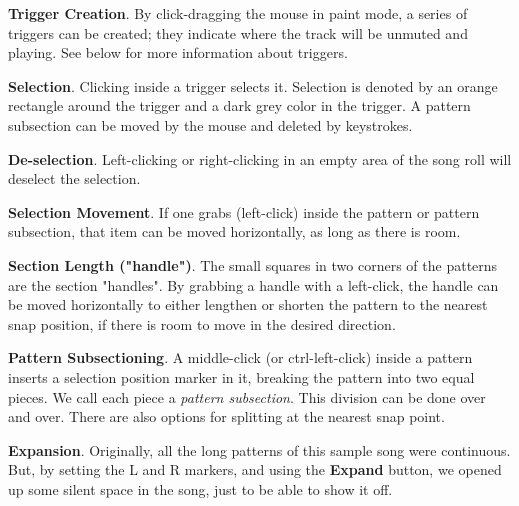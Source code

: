    \begin{enumber}
      \item \textbf{Trigger Creation}.
         By click-dragging the mouse in paint mode, a series of triggers can be
         created; they indicate where the track will be unmuted and playing.
         See below for more information about triggers.
      \item \textbf{Selection}.
         Clicking inside a trigger selects it.
         Selection is denoted by an orange rectangle around the trigger
         and a dark grey color in the trigger.
         A pattern subsection can be moved by the mouse and deleted by
         keystrokes.
      \item \textbf{De-selection}.
         Left-clicking or right-clicking in an empty area of the song roll
         will deselect the selection.
      \item \textbf{Selection Movement}.
         If one grabs (left-click) inside
         the pattern or pattern subsection, that item can be moved
         horizontally, as long as there is room.
      \item \textbf{Section Length ("handle")}.
         The small squares in two corners of the patterns are the section
         "handles".
         By grabbing a handle with a left-click, the handle can be moved
         horizontally to either lengthen or shorten the pattern to the nearest
         snap position, if there is room to move in the desired direction.
      \item \textbf{Pattern Subsectioning}.
         A middle-click (or ctrl-left-click)
         inside a pattern inserts a selection position
         marker in it, breaking the pattern into two equal pieces.
         We call each piece a \textsl{pattern subsection}.
         This division can be done over and over.
         There are also options for splitting at the nearest snap point.
      \item \textbf{Expansion}.
         Originally, all the long patterns of this sample song were continuous.
         But, by setting the L and R markers, and using the \textbf{Expand}
         button, we opened up some silent space in the song, just to be able
         to show it off.
   \end{enumber}


